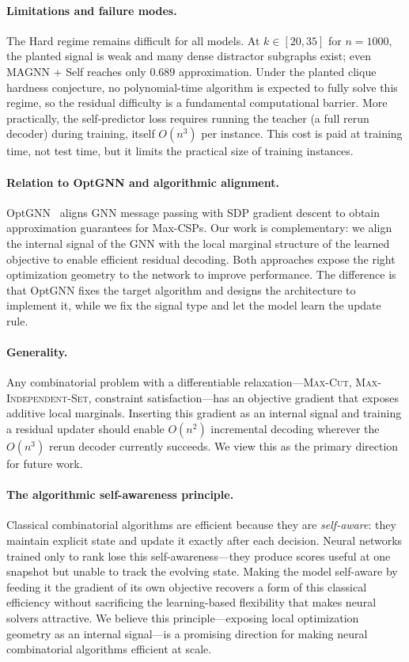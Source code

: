 \documentclass[11pt]{article}
\theoremstyle{plain}
\theoremstyle{definition}
\theoremstyle{remark}
\begin{document}
\paragraph{Limitations and failure modes.}
The Hard regime remains difficult for all models. At $k \in [20, 35]$ for $n=1000$,
the planted signal is weak and many dense distractor subgraphs exist; even MAGNN +
Self reaches only $0.689$ approximation. Under the planted clique hardness
conjecture, no polynomial-time algorithm is expected to fully solve this regime, so
the residual difficulty is a fundamental computational barrier. More practically, the
self-predictor loss requires running the teacher (a full rerun decoder) during
training, itself $O(n^3)$ per instance. This cost is paid at training time, not test
time, but it limits the practical size of training instances.

\paragraph{Relation to OptGNN and algorithmic alignment.}
OptGNN~\citep{yau2023} aligns GNN message passing with SDP gradient descent to
obtain approximation guarantees for Max-CSPs. Our work is complementary: we align
the internal signal of the GNN with the local marginal structure of the learned
objective to enable efficient residual decoding. Both approaches expose the right
optimization geometry to the network to improve performance. The difference is that
OptGNN fixes the target algorithm and designs the architecture to implement it, while
we fix the signal type and let the model learn the update rule.

\paragraph{Generality.}
Any combinatorial problem with a differentiable relaxation---\textsc{Max-Cut},
\textsc{Max-Independent-Set}, constraint satisfaction---has an objective gradient
that exposes additive local marginals. Inserting this gradient as an internal signal
and training a residual updater should enable $O(n^2)$ incremental decoding wherever
the $O(n^3)$ rerun decoder currently succeeds. We view this as the primary direction
for future work.

\paragraph{The algorithmic self-awareness principle.}
Classical combinatorial algorithms are efficient because they are \emph{self-aware}:
they maintain explicit state and update it exactly after each decision. Neural
networks trained only to rank lose this self-awareness---they produce scores useful
at one snapshot but unable to track the evolving state. Making the model self-aware
by feeding it the gradient of its own objective recovers a form of this classical
efficiency without sacrificing the learning-based flexibility that makes neural
solvers attractive. We believe this principle---exposing local optimization geometry
as an internal signal---is a promising direction for making neural combinatorial
algorithms efficient at scale.
\end{document}
